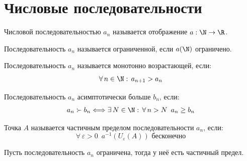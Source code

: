 \documentclass[12pt]{article}
\begin{document}
\section{Числовые последовательности}

\begin{definition}
    Числовой последовательностью $a_n$ называется отображение $a:\N \to \R$.
\end{definition}
\begin{definition}
    Последовательность $a_n$ называется ограниченной, если $a(\N)$ ограничено. 
\end{definition}
\begin{definition}
    Последовательность $a_n$ называется монотонно возрастающей, если:
    $$\forall\, n \in \N:\, a_{n+1}>a_n$$
\end{definition}
\begin{definition}
    Последовательность $a_n$ асимптотически больше $b_n$, если:
    $$a_n\succ b_n\Longleftrightarrow\exists\, N\in \N:\,\forall\,n>N\enspace a_n\geq b_n$$
\end{definition}
\begin{definition}
    Точка $A$ называется частичным пределом последовательности $a_n$, если:
    $$\forall\,\varepsilon>0\enspace a^{-1}(U_\varepsilon(A))\text{ бесконечно}$$
\end{definition}
\begin{theorem}
    Пусть последовательность $a_n$ ограничена, тогда у неё есть частичный предел.
\end{theorem}
\end{document}
